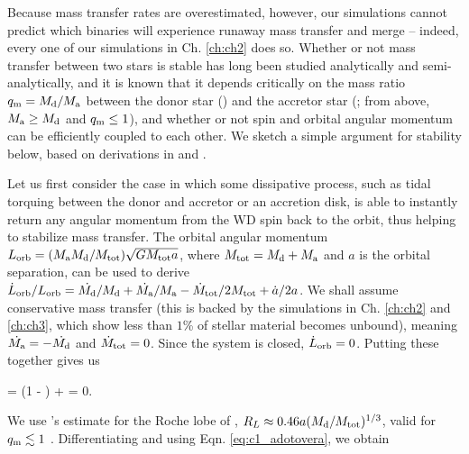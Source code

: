 

Because mass transfer rates are overestimated, however, our simulations cannot predict which binaries will experience runaway mass transfer and merge -- indeed, every one of our simulations in Ch. \ref{ch:ch2} does so.  Whether or not mass transfer between two stars is stable has long been studied analytically and semi-analytically, and it is known that it depends critically on the mass ratio $\qm = \Md/\Ma$ between the donor star (\Md) and the accretor star (\Ma; from above, $\Ma \geq \Md$ and $\qm \leq 1$), and whether or not spin and orbital angular momentum can be efficiently coupled to each other.  We sketch a simple argument for stability below, based on derivations in \cite{marsns04} and \cite{dan+11}.

Let us first consider the case in which some dissipative process, such as tidal torquing between the donor and accretor or an accretion disk, is able to instantly return any angular momentum from the WD spin back to the orbit, thus helping to stabilize mass transfer.  The orbital angular momentum $L_\mrm{orb} = (\Ma\Md/\Mtot)\sqrt{G\Mtot a}$, where $\Mtot = \Md + \Ma$ and $a$ is the orbital separation, can be used to derive $\dot{L}_\mrm{orb}/L_\mrm{orb} = \dot{\Md}/\Md + \dot{\Ma}/\Ma - \dot{M}_\mrm{tot}/2\Mtot + \dot{a}/2a$.  We shall assume conservative mass transfer (this is backed by the simulations in Ch. \ref{ch:ch2} and \ref{ch:ch3}, which show less than $1$\% of stellar material becomes unbound), meaning $\dot{\Ma} = -\dot{\Md}$ and $\dot{M}_\mathrm{tot} = 0$.  Since the system is closed, $\dot{L}_\mathrm{orb} = 0$.  Putting these together gives us

\eqbegin
{} = (1 - \qm)\frac{\dot{\Md}}{\Md} +  = 0.
\label{eq:c1_adotovera}
\eqend

\noindent We use \cite{pacz71}'s estimate for the Roche lobe of \Md, $R_L \approx 0.46a(\Md/\Mtot)^{1/3}$, valid for $\qm \lesssim 1$ \citep{eggl83}.  Differentiating and using Eqn. \ref{eq:c1_adotovera}, we obtain

